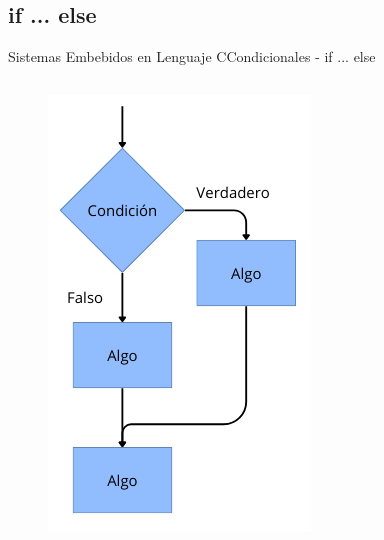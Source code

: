 \documentclass[aspectratio=169, xcolor=dvipsnames]{beamer}
\begin{document}
\subsection{if ... else}
\begin{frame}{Sistemas Embebidos en Lenguaje C}{Condicionales - if ... else}
\begin{columns}
    \begin{column}{0.5\textwidth}
    \begin{figure}
        \centering
        \includegraphics[width=0.5\linewidth]{resources/images/if_else.png}
    \end{figure}
    \end{column}
    \begin{column}{0.5\textwidth}
        
    \end{column}
\end{columns}
\end{frame}
\end{document}

